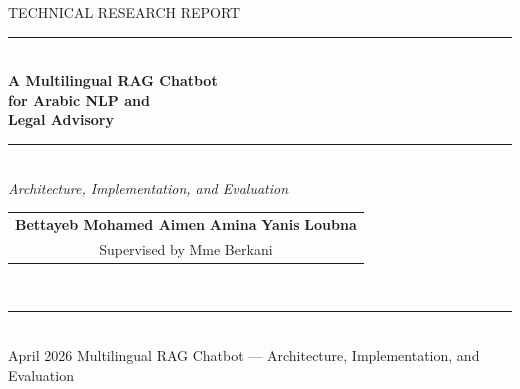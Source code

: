 \documentclass[12pt, a4paper]{article}
\begin{document}
\begin{titlepage}
  \pagecolor{primary}
  \color{white}\centering
  \vspace*{2.5cm}
  {\fontsize{11}{13}\selectfont\color{lightblue}\MakeUppercase{Technical Research Report}}\\[0.4cm]
  \color{white}\rule{0.5\linewidth}{0.6pt}\\[1.2cm]
  {\fontsize{22}{27}\selectfont\bfseries
    A Multilingual RAG Chatbot\\[0.25em]
    for Arabic NLP and\\[0.25em]
    Legal Advisory}\\[1.0cm]
  \color{lightblue}\rule{0.4\linewidth}{0.4pt}\\[0.8cm]
  {\normalsize\itshape Architecture, Implementation, and Evaluation}\\[2.5cm]
  {\small
    \begin{tabular}{c}
      \textbf{Bettayeb Mohamed Aimen} \quad \textbf{Amina} \quad \textbf{Yanis} \quad \textbf{Loubna}\\[0.4em]
      \color{lightblue}Supervised by Mme Berkani
    \end{tabular}
  }\\[1.8cm]
  \color{lightblue}\rule{0.3\linewidth}{0.3pt}\\[0.5cm]
  {\small April 2026}
  \vfill
  {\footnotesize\color{medgray} Multilingual RAG Chatbot --- Architecture, Implementation, and Evaluation}
\end{titlepage}
\nopagecolor
\end{document}
